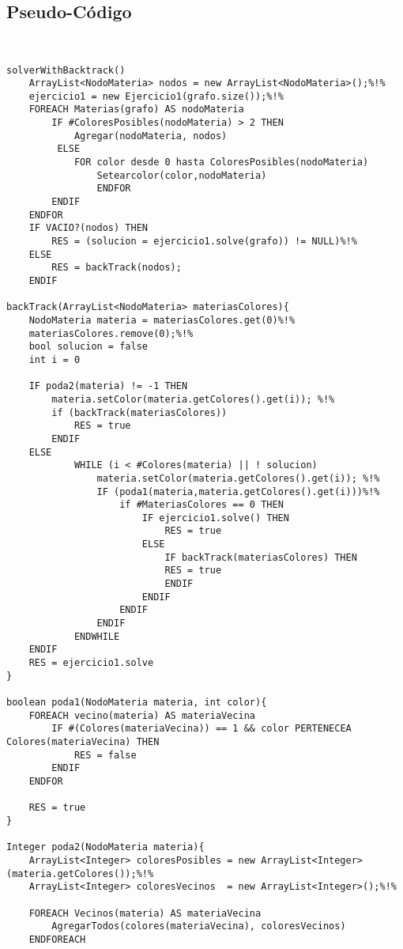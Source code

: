 \subsection{Pseudo-C\'odigo}
\begin{verbatim}


solverWithBacktrack()
    ArrayList<NodoMateria> nodos = new ArrayList<NodoMateria>();%!%
    ejercicio1 = new Ejercicio1(grafo.size());%!%
    FOREACH Materias(grafo) AS nodoMateria
        IF #ColoresPosibles(nodoMateria) > 2 THEN
            Agregar(nodoMateria, nodos)
         ELSE 
            FOR color desde 0 hasta ColoresPosibles(nodoMateria)
                Setearcolor(color,nodoMateria)
                ENDFOR
        ENDIF
    ENDFOR
    IF VACIO?(nodos) THEN
        RES = (solucion = ejercicio1.solve(grafo)) != NULL)%!%
    ELSE
        RES = backTrack(nodos);            
    ENDIF

backTrack(ArrayList<NodoMateria> materiasColores){
    NodoMateria materia = materiasColores.get(0)%!%
    materiasColores.remove(0);%!%
    bool solucion = false
    int i = 0
    
    IF poda2(materia) != -1 THEN
        materia.setColor(materia.getColores().get(i)); %!%
        if (backTrack(materiasColores))
            RES = true
        ENDIF
    ELSE 
            WHILE (i < #Colores(materia) || ! solucion)
                materia.setColor(materia.getColores().get(i)); %!%
                IF (poda1(materia,materia.getColores().get(i)))%!%
                    if #MateriasColores == 0 THEN
                        IF ejercicio1.solve() THEN 
                            RES = true
                        ELSE 
                            IF backTrack(materiasColores) THEN
                            RES = true
                            ENDIF
                        ENDIF        
                    ENDIF
                ENDIF
            ENDWHILE
    ENDIF
    RES = ejercicio1.solve
}
    
boolean poda1(NodoMateria materia, int color){
    FOREACH vecino(materia) AS materiaVecina
        IF #(Colores(materiaVecina)) == 1 && color PERTENECEA Colores(materiaVecina) THEN
            RES = false
        ENDIF
    ENDFOR
    
    RES = true
}
    
Integer poda2(NodoMateria materia){
    ArrayList<Integer> coloresPosibles = new ArrayList<Integer>(materia.getColores());%!%
    ArrayList<Integer> coloresVecinos  = new ArrayList<Integer>();%!%

    FOREACH Vecinos(materia) AS materiaVecina
        AgregarTodos(colores(materiaVecina), coloresVecinos)
    ENDFOREACH
    

\end{verbatim}
